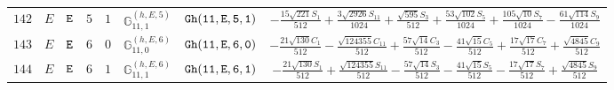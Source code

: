 \documentclass[fleqn,8pt]{jsarticle}
\begin{document}
\begin{table}[ht!]
\begin{center}
\begin{tabular}{cccccccc}
$ 142 $ & $ E $ & $ {\tt E} $ & $ 5 $ & $ 1 $ & $ \mathbb{G}_{11,1}^{(h,E,5)} $ & $ {\tt Gh(11,E,5,1)} $ & $ - \frac{15 \sqrt{221} S_{1}}{512} + \frac{3 \sqrt{2926} S_{11}}{1024} + \frac{\sqrt{595} S_{3}}{512} + \frac{53 \sqrt{102} S_{5}}{1024} + \frac{105 \sqrt{10} S_{7}}{1024} - \frac{61 \sqrt{114} S_{9}}{1024} $ \\
$ 143 $ & $ E $ & $ {\tt E} $ & $ 6 $ & $ 0 $ & $ \mathbb{G}_{11,0}^{(h,E,6)} $ & $ {\tt Gh(11,E,6,0)} $ & $ - \frac{21 \sqrt{130} C_{1}}{512} - \frac{\sqrt{124355} C_{11}}{512} + \frac{57 \sqrt{14} C_{3}}{512} - \frac{41 \sqrt{15} C_{5}}{512} + \frac{17 \sqrt{17} C_{7}}{512} + \frac{\sqrt{4845} C_{9}}{512} $ \\
$ 144 $ & $ E $ & $ {\tt E} $ & $ 6 $ & $ 1 $ & $ \mathbb{G}_{11,1}^{(h,E,6)} $ & $ {\tt Gh(11,E,6,1)} $ & $ - \frac{21 \sqrt{130} S_{1}}{512} + \frac{\sqrt{124355} S_{11}}{512} - \frac{57 \sqrt{14} S_{3}}{512} - \frac{41 \sqrt{15} S_{5}}{512} - \frac{17 \sqrt{17} S_{7}}{512} + \frac{\sqrt{4845} S_{9}}{512} $ \\
 \hline \hline
\end{tabular}
\end{center}
\end{table}
\end{document}
